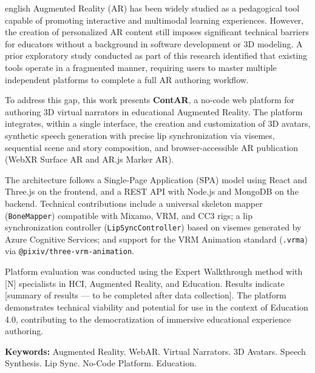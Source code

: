 \documentclass[
  12pt,
  openright,
  twoside,
  a4paper,
  english,
  brazil
]{abntex2}
\begin{document}
\begin{resumo}[Abstract]
  \begin{otherlanguage*}{english}
    Augmented Reality (AR) has been widely studied as a pedagogical tool
    capable of promoting interactive and multimodal learning experiences.
    However, the creation of personalized AR content still imposes significant
    technical barriers for educators without a background in software
    development or 3D modeling. A prior exploratory study conducted as part of
    this research identified that existing tools operate in a fragmented
    manner, requiring users to master multiple independent platforms to
    complete a full AR authoring workflow.

    To address this gap, this work presents \textbf{ContAR}, a no-code web
    platform for authoring 3D virtual narrators in educational Augmented
    Reality. The platform integrates, within a single interface, the creation
    and customization of 3D avatars, synthetic speech generation with
    precise lip synchronization via visemes, sequential scene and story
    composition, and browser-accessible AR publication (WebXR Surface AR
    and AR.js Marker AR).

    The architecture follows a Single-Page Application (SPA) model using
    React and Three.js on the frontend, and a REST API with Node.js and
    MongoDB on the backend. Technical contributions include a universal
    skeleton mapper (\texttt{BoneMapper}) compatible with Mixamo, VRM, and
    CC3 rigs; a lip synchronization controller (\texttt{LipSyncController})
    based on visemes generated by Azure Cognitive Services; and support for
    the VRM Animation standard (\texttt{.vrma}) via
    \texttt{@pixiv/three-vrm-animation}.

    Platform evaluation was conducted using the Expert Walkthrough method
    with [N] specialists in HCI, Augmented Reality, and Education. Results
    indicate [summary of results — to be completed after data collection].
    The platform demonstrates technical viability and potential for use in
    the context of Education 4.0, contributing to the democratization of
    immersive educational experience authoring.

    \vspace{\onelineskip}
    \noindent\textbf{Keywords:}
    Augmented Reality.
    WebAR.
    Virtual Narrators.
    3D Avatars.
    Speech Synthesis.
    Lip Sync.
    No-Code Platform.
    Education.
  \end{otherlanguage*}
\end{resumo}
\end{document}
